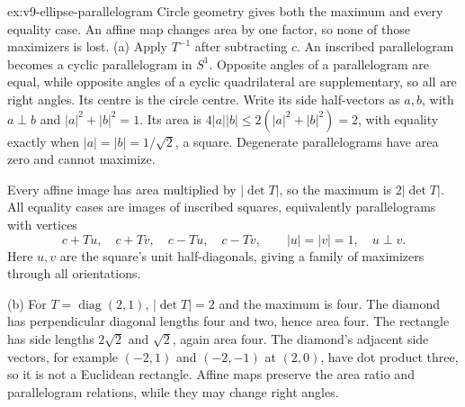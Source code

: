 \begin{solution}{ex:v9-ellipse-parallelogram}
\idea Circle geometry gives both the maximum and every equality case. An affine map changes area by one factor, so none of those maximizers is lost.
\writeup (a) Apply $T^{-1}$ after subtracting $c$. An inscribed parallelogram becomes a cyclic parallelogram in $S^1$. Opposite angles of a parallelogram are equal, while opposite angles of a cyclic quadrilateral are supplementary, so all are right angles. Its centre is the circle centre. Write its side half-vectors as $a,b$, with $a\perp b$ and $|a|^2+|b|^2=1$. Its area is
$4|a||b|\le2(|a|^2+|b|^2)=2$, with equality exactly when $|a|=|b|=1/\sqrt2$, a square. Degenerate parallelograms have area zero and cannot maximize.

Every affine image has area multiplied by $|\det T|$, so the maximum is $2|\det T|$. All equality cases are images of inscribed squares, equivalently parallelograms with vertices
\[
c+Tu,\quad c+Tv,\quad c-Tu,\quad c-Tv,
\qquad |u|=|v|=1,\quad u\perp v.
\]
Here $u,v$ are the square's unit half-diagonals, giving a family of maximizers through all orientations.

(b) For $T=\operatorname{diag}(2,1)$, $|\det T|=2$ and the maximum is four. The diamond has perpendicular diagonal lengths four and two, hence area four. The rectangle has side lengths $2\sqrt2$ and $\sqrt2$, again area four. The diamond's adjacent side vectors, for example $(-2,1)$ and $(-2,-1)$ at $(2,0)$, have dot product three, so it is not a Euclidean rectangle. Affine maps preserve the area ratio and parallelogram relations, while they may change right angles.
\end{solution}

